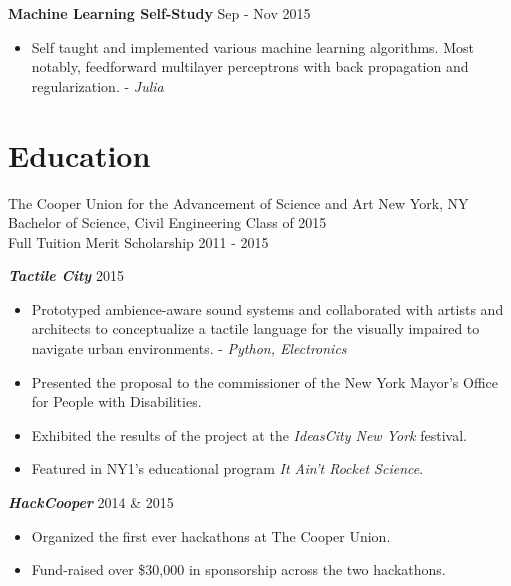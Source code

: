 \documentclass[overlapped]{res}
\begin{document}
\begin{resume}
    {\bf Machine Learning Self-Study} \hfill Sep - Nov 2015
    \begin{itemize} \itemsep-2pt
        \item
            Self taught and implemented various machine learning algorithms.
            Most notably, feedforward multilayer perceptrons with back propagation and regularization. - {\em Julia}
    \end{itemize}


    \section{Education}
    The Cooper Union for the Advancement of Science and Art \hfill New York, NY  \\
    Bachelor of Science, Civil Engineering              \hfill Class of 2015 \\
    Full Tuition Merit Scholarship                          \hfill 2011 - 2015

    {{\bf {\em Tactile City\/}}} \hfill 2015
    \begin{itemize} \itemsep-2pt
        \item
            Prototyped ambience-aware sound systems and collaborated with artists and architects to conceptualize a tactile language for the visually impaired to navigate urban environments. - {\em Python, Electronics\/}
        \item
            Presented the proposal to the commissioner of the New York Mayor's Office for People with Disabilities.
        \item
            Exhibited the results of the project at the {\em IdeasCity New York} festival.
        \item
            Featured in NY1's educational program {\em It Ain't Rocket Science\/}.
    \end{itemize}

    {\bf {\em HackCooper\/}} \hfill 2014 \& 2015
    \begin{itemize} \itemsep-2pt
        \item
            Organized the first ever hackathons at The Cooper Union.
        \item
            Fund-raised over \$30,000 in sponsorship across the two hackathons.
    \end{itemize}


\end{resume}
\end{document}
